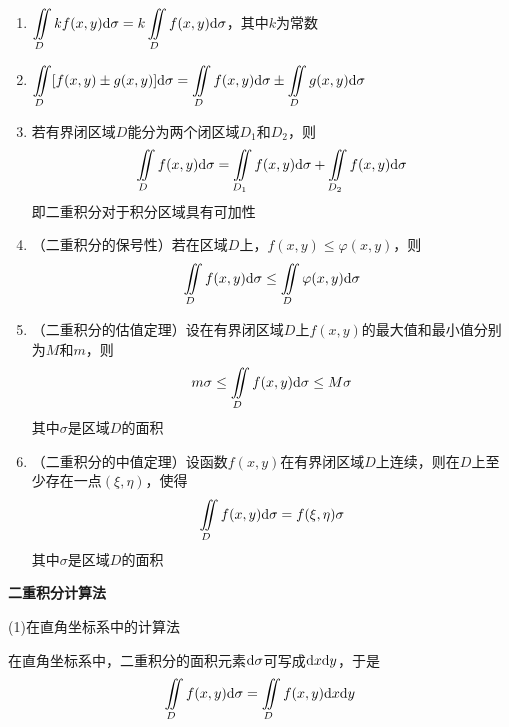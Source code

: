 \begin{property} \label{property:double_integral}
    \begin{enumerate}
        \item $\displaystyle\iint \limits_{D} kf(x,y)\mathrm{d}\sigma=k\iint \limits_{D} f(x,y)\mathrm{d}\sigma$，其中$k$为常数
        \item $\displaystyle\iint \limits_{D} [f(x,y)\pm g(x,y)]\mathrm{d}\sigma=\iint \limits_{D} f(x,y)\mathrm{d}\sigma\pm\iint \limits_{D} g(x,y)\mathrm{d}\sigma$
        \item 若有界闭区域$D$能分为两个闭区域$D_1$和$D_2$，则
        \begin{equation*}
            \iint \limits_{D} f(x,y)\mathrm{d}\sigma=\iint \limits_{D_1} f(x,y)\mathrm{d}\sigma+\iint \limits_{D_2} f(x,y)\mathrm{d}\sigma
        \end{equation*}
        即二重积分对于积分区域具有可加性
        \item （二重积分的保号性）若在区域$D$上，$f(x,y)\leq\varphi(x,y)$，则
        \begin{equation*}
            \iint \limits_{D} f(x,y)\mathrm{d}\sigma\leq\iint \limits_{D} \varphi(x,y)\mathrm{d}\sigma
        \end{equation*}
        \item （二重积分的估值定理）设在有界闭区域$D$上$f(x,y)$的最大值和最小值分别为$M$和$m$，则
        \begin{equation*}
            m\sigma\leq\iint \limits_{D} f(x,y)\mathrm{d}\sigma\leq M\sigma
        \end{equation*}
        其中$\sigma$是区域$D$的面积
        \item （二重积分的中值定理）设函数$f(x,y)$在有界闭区域$D$上连续，则在$D$上至少存在一点$(\xi,\eta)$，使得
        \begin{equation*}
            \iint \limits_{D} f(x,y)\mathrm{d}\sigma=f(\xi,\eta)\sigma
        \end{equation*}
        其中$\sigma$是区域$D$的面积
    \end{enumerate}
\end{property}

\textbf{二重积分计算法}

(1)在直角坐标系中的计算法

在直角坐标系中，二重积分的面积元素$\mathrm{d}\sigma$可写成$\mathrm{d} x\mathrm{d} y$，于是
\begin{equation*}
    \iint \limits_{D} f(x,y)\mathrm{d}\sigma=\iint \limits_{D} f(x,y)\mathrm{d} x\mathrm{d} y
\end{equation*}


